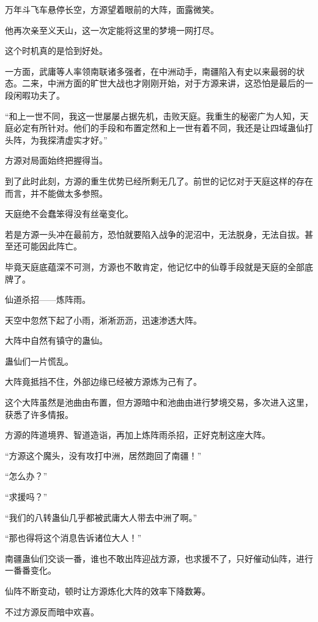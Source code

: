 
\begin{this_body}

万年斗飞车悬停长空，方源望着眼前的大阵，面露微笑。

他再次亲至义天山，这一次定能将这里的梦境一网打尽。

这个时机真的是恰到好处。

一方面，武庸等人率领南联诸多强者，在中洲动手，南疆陷入有史以来最弱的状态。二来，中洲方面的旷世大战也才刚刚开始，对于方源来讲，这恐怕是最后的一段闲暇功夫了。

“和上一世不同，我这一世屡屡占据先机，击败天庭。我重生的秘密广为人知，天庭必定有所针对。他们的手段和布置定然和上一世有着不同，我还是让四域蛊仙打头阵，为我探清虚实才好。”

方源对局面始终把握得当。

到了此时此刻，方源的重生优势已经所剩无几了。前世的记忆对于天庭这样的存在而言，并不能做太多参照。

天庭绝不会蠢笨得没有丝毫变化。

若是方源一头冲在最前方，恐怕就要陷入战争的泥沼中，无法脱身，无法自拔。甚至还可能因此阵亡。

毕竟天庭底蕴深不可测，方源也不敢肯定，他记忆中的仙尊手段就是天庭的全部底牌了。

仙道杀招——炼阵雨。

天空中忽然下起了小雨，淅淅沥沥，迅速渗透大阵。

大阵中自然有镇守的蛊仙。

蛊仙们一片慌乱。

大阵竟抵挡不住，外部边缘已经被方源炼为己有了。

这个大阵虽然是池曲由布置，但方源暗中和池曲由进行梦境交易，多次进入这里，获悉了许多情报。

方源的阵道境界、智道造诣，再加上炼阵雨杀招，正好克制这座大阵。

“方源这个魔头，没有攻打中洲，居然跑回了南疆！”

“怎么办？”

“求援吗？”

“我们的八转蛊仙几乎都被武庸大人带去中洲了啊。”

“那也得将这个消息告诉诸位大人！”

南疆蛊仙们交谈一番，谁也不敢出阵迎战方源，也求援不了，只好催动仙阵，进行一番番变化。

仙阵不断变动，顿时让方源炼化大阵的效率下降数筹。

不过方源反而暗中欢喜。


\end{this_body}
